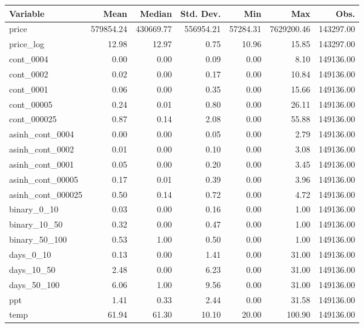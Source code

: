 \begin{table}[ht]
\centering
\begin{tabular}{lrrrrrr}
  \toprule
Variable & Mean & Median & Std. Dev. & Min & Max & Obs. \\ 
  \midrule
price & 579854.24 & 430669.77 & 556954.21 & 57284.31 & 7629200.46 & 143297.00 \\ 
  price\_log & 12.98 & 12.97 & 0.75 & 10.96 & 15.85 & 143297.00 \\ 
  cont\_0004 & 0.00 & 0.00 & 0.09 & 0.00 & 8.10 & 149136.00 \\ 
  cont\_0002 & 0.02 & 0.00 & 0.17 & 0.00 & 10.84 & 149136.00 \\ 
  cont\_0001 & 0.06 & 0.00 & 0.35 & 0.00 & 15.66 & 149136.00 \\ 
  cont\_00005 & 0.24 & 0.01 & 0.80 & 0.00 & 26.11 & 149136.00 \\ 
  cont\_000025 & 0.87 & 0.14 & 2.08 & 0.00 & 55.88 & 149136.00 \\ 
  asinh\_cont\_0004 & 0.00 & 0.00 & 0.05 & 0.00 & 2.79 & 149136.00 \\ 
  asinh\_cont\_0002 & 0.01 & 0.00 & 0.10 & 0.00 & 3.08 & 149136.00 \\ 
  asinh\_cont\_0001 & 0.05 & 0.00 & 0.20 & 0.00 & 3.45 & 149136.00 \\ 
  asinh\_cont\_00005 & 0.17 & 0.01 & 0.39 & 0.00 & 3.96 & 149136.00 \\ 
  asinh\_cont\_000025 & 0.50 & 0.14 & 0.72 & 0.00 & 4.72 & 149136.00 \\ 
  binary\_0\_10 & 0.03 & 0.00 & 0.16 & 0.00 & 1.00 & 149136.00 \\ 
  binary\_10\_50 & 0.32 & 0.00 & 0.47 & 0.00 & 1.00 & 149136.00 \\ 
  binary\_50\_100 & 0.53 & 1.00 & 0.50 & 0.00 & 1.00 & 149136.00 \\ 
  days\_0\_10 & 0.13 & 0.00 & 1.41 & 0.00 & 31.00 & 149136.00 \\ 
  days\_10\_50 & 2.48 & 0.00 & 6.23 & 0.00 & 31.00 & 149136.00 \\ 
  days\_50\_100 & 6.06 & 1.00 & 9.56 & 0.00 & 31.00 & 149136.00 \\ 
  ppt & 1.41 & 0.33 & 2.44 & 0.00 & 31.58 & 149136.00 \\ 
  temp & 61.94 & 61.30 & 10.10 & 20.00 & 100.90 & 149136.00 \\ 
   \bottomrule
\end{tabular}
\end{table}
